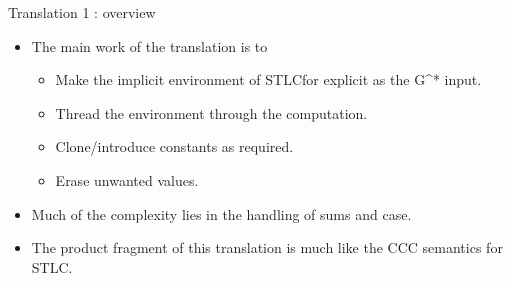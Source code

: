\documentclass[svgnames,11pt]{beamer}
\begin{document}
\begin{frame}{Translation 1 : overview}

\vfill
  \begin{itemize}


    \vfill
  \item The main work of the translation is to

  \begin{itemize}
  \item Make the implicit environment of {{STLCfor}} explicit as the {{G^*}} input.
  \item Thread the environment through the computation.
  \item Clone/introduce constants as required. 
  \item Erase unwanted values.
  \end{itemize}

\vfill
  \item Much of the complexity lies in the handling of sums and {{case}}. 

\vfill
  \item The product fragment of this translation is much like the
    {{CCC}} semantics for {{STLC}}.

  \end{itemize}
\vfill  

\end{frame}




\begin{frame}
  
    \begin{center}
    \end{center}

\end{frame}
\end{document}
